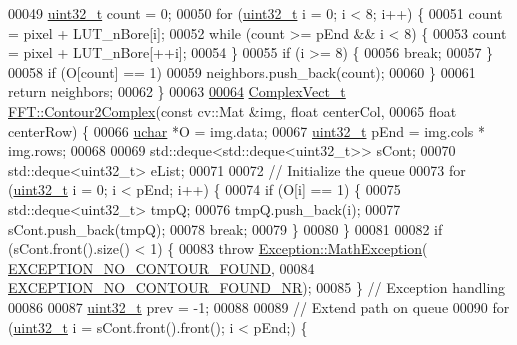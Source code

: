 \begin{DoxyCode}
00049   \hyperlink{_soil_math_types_8h_a435d1572bf3f880d55459d9805097f62}{uint32\_t} count = 0;
00050   \textcolor{keywordflow}{for} (\hyperlink{_soil_math_types_8h_a435d1572bf3f880d55459d9805097f62}{uint32\_t} i = 0; i < 8; i++) \{
00051     count = pixel + LUT\_nBore[i];
00052     \textcolor{keywordflow}{while} (count >= pEnd && i < 8) \{
00053       count = pixel + LUT\_nBore[++i];
00054     \}
00055     \textcolor{keywordflow}{if} (i >= 8) \{
00056       \textcolor{keywordflow}{break};
00057     \}
00058     \textcolor{keywordflow}{if} (O[count] == 1)
00059       neighbors.push\_back(count);
00060   \}
00061   \textcolor{keywordflow}{return} neighbors;
00062 \}
00063 
\hypertarget{_f_f_t_8cpp_source_l00064}{}\hyperlink{class_soil_math_1_1_f_f_t_a18a95490ea8e929584c2af6569dec3b6}{00064} \hyperlink{_soil_math_types_8h_a7567e521c2b2c408dcb62dbff72390f7}{ComplexVect\_t} \hyperlink{class_soil_math_1_1_f_f_t_a18a95490ea8e929584c2af6569dec3b6}{FFT::Contour2Complex}(\textcolor{keyword}{const} cv::Mat &img, \textcolor{keywordtype}{float} centerCol,
00065                                    \textcolor{keywordtype}{float} centerRow) \{
00066   \hyperlink{_soil_math_types_8h_a65f85814a8290f9797005d3b28e7e5fc}{uchar} *O = img.data;
00067   \hyperlink{_soil_math_types_8h_a435d1572bf3f880d55459d9805097f62}{uint32\_t} pEnd = img.cols * img.rows;
00068 
00069   std::deque<std::deque<uint32\_t>> sCont;
00070   std::deque<uint32\_t> eList;
00071 
00072   \textcolor{comment}{// Initialize the queue}
00073   \textcolor{keywordflow}{for} (\hyperlink{_soil_math_types_8h_a435d1572bf3f880d55459d9805097f62}{uint32\_t} i = 0; i < pEnd; i++) \{
00074     \textcolor{keywordflow}{if} (O[i] == 1) \{
00075       std::deque<uint32\_t> tmpQ;
00076       tmpQ.push\_back(i);
00077       sCont.push\_back(tmpQ);
00078       \textcolor{keywordflow}{break};
00079     \}
00080   \}
00081 
00082   \textcolor{keywordflow}{if} (sCont.front().size() < 1) \{
00083     \textcolor{keywordflow}{throw} \hyperlink{class_soil_math_1_1_exception_1_1_math_exception}{Exception::MathException}(
      \hyperlink{_math_exception_8h_a39b49da54ac54198f948ea87cd429c1c}{EXCEPTION\_NO\_CONTOUR\_FOUND},
00084                                    \hyperlink{_math_exception_8h_a3c2849e602d9d4c0dba3f2d3301d9cbf}{EXCEPTION\_NO\_CONTOUR\_FOUND\_NR});
00085   \} \textcolor{comment}{// Exception handling}
00086 
00087   \hyperlink{_soil_math_types_8h_a435d1572bf3f880d55459d9805097f62}{uint32\_t} prev = -1;
00088 
00089   \textcolor{comment}{// Extend path on queue}
00090   \textcolor{keywordflow}{for} (\hyperlink{_soil_math_types_8h_a435d1572bf3f880d55459d9805097f62}{uint32\_t} i = sCont.front().front(); i < pEnd;) \{

\end{DoxyCode}
